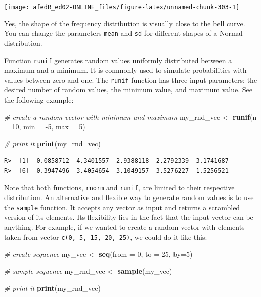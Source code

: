 \documentclass[
  12pt,
]{book}
\newenvironment{Shaded}{\begin{snugshade}}{\end{snugshade}}
\newcommand{\CommentTok}[1]{\textcolor[rgb]{0.37,0.37,0.37}{\textit{#1}}}
\newcommand{\DataTypeTok}[1]{\textcolor[rgb]{0.27,0.27,0.27}{#1}}
\newcommand{\DecValTok}[1]{\textcolor[rgb]{0.06,0.06,0.06}{#1}}
\newcommand{\KeywordTok}[1]{\textcolor[rgb]{0.27,0.27,0.27}{\textbf{#1}}}
\newcommand{\NormalTok}[1]{#1}
\newcommand{\StringTok}[1]{\textcolor[rgb]{0.5,0.5,0.5}{#1}}
\begin{document}
\begin{center}\texttt{[image: afedR\_ed02-ONLINE\_files/figure-latex/unnamed-chunk-303-1]} \end{center}

Yes, the shape of the frequency distribution is visually close to the bell curve. You can change the parameters \texttt{mean} and \texttt{sd} for different shapes of a Normal distribution.

Function \texttt{runif} generates random values uniformly distributed between a maximum and a minimum. It is commonly used to simulate probabilities with values between zero and one. The \texttt{runif} function has three input parameters: the desired number of random values, the minimum value, and maximum value. See the following example:

\begin{Shaded}
\begin{Highlighting}[]
\CommentTok{# create a random vector with minimum and maximum}
\NormalTok{my_rnd_vec <-}\StringTok{ }\KeywordTok{runif}\NormalTok{(}\DataTypeTok{n =} \DecValTok{10}\NormalTok{, }
                    \DataTypeTok{min =} \DecValTok{-5}\NormalTok{, }
                    \DataTypeTok{max =} \DecValTok{5}\NormalTok{)}

\CommentTok{# print it}
\KeywordTok{print}\NormalTok{(my_rnd_vec)}
\end{Highlighting}
\end{Shaded}

\begin{verbatim}
R>  [1] -0.0858712  4.3401557  2.9388118 -2.2792339  3.1741687
R>  [6] -0.3947496  3.4054654  3.1049157  3.5276227 -1.5256521
\end{verbatim}

Note that both functions, \texttt{rnorm} and \texttt{runif}, are limited to their respective distribution. An alternative and flexible way to generate random values is to use the \texttt{sample} function. It accepts any vector as input and returns a scrambled version of its elements. Its flexibility lies in the fact that the input vector can be anything. For example, if we wanted to create a random vector with elements taken from vector \texttt{c(0,\ 5,\ 15,\ 20,\ 25)}, we could do it like this: 

\begin{Shaded}
\begin{Highlighting}[]
\CommentTok{# create sequence}
\NormalTok{my_vec <-}\StringTok{ }\KeywordTok{seq}\NormalTok{(}\DataTypeTok{from =} \DecValTok{0}\NormalTok{, }\DataTypeTok{to =} \DecValTok{25}\NormalTok{, }\DataTypeTok{by=}\DecValTok{5}\NormalTok{)}

\CommentTok{# sample sequence}
\NormalTok{my_rnd_vec <-}\StringTok{ }\KeywordTok{sample}\NormalTok{(my_vec)}

\CommentTok{# print it}
\KeywordTok{print}\NormalTok{(my_rnd_vec)}
\end{Highlighting}
\end{Shaded}
\end{document}

